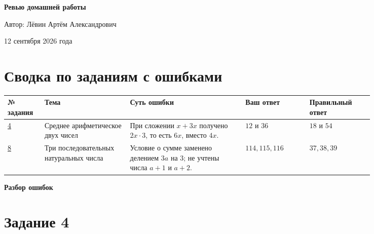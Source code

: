\documentclass[12pt,a4paper]{article}
\begin{document}
\hypersetup{pageanchor=false}

\begin{titlepage}
\thispagestyle{empty}
\begin{center}
\vspace*{0.22\textheight}
{\LARGE\bfseries Ревью домашней работы\par}
\vspace{1.4em}
{\large Автор: Лёвин Артём Александрович\par}
\vspace{0.8em}
{\large 12 сентября 2026 года\par}
\vfill
{}
\end{center}
\end{titlepage}
\hypersetup{pageanchor=true}

\newpage
\section*{Сводка по заданиям с ошибками}
\small
\begin{center}
\begin{tabular}{P{0.07\linewidth} P{0.20\linewidth} P{0.27\linewidth} P{0.15\linewidth} P{0.15\linewidth}}
\toprule
№ задания & Тема & Суть ошибки & Ваш ответ & Правильный ответ \\
\midrule
\hyperref[task:4]{4} & Среднее арифметическое двух чисел & При сложении $x+3x$ получено $2x\cdot3$, то есть $6x$, вместо $4x$. & $12$ и $36$ & $18$ и $54$ \\
\addlinespace
\hyperref[task:8]{8} & Три последовательных натуральных числа & Условие о сумме заменено делением $3a$ на $3$; не учтены числа $a+1$ и $a+2$. & $114,115,116$ & $37,38,39$ \\
\bottomrule
\end{tabular}
\end{center}
\normalsize

\newpage
\thispagestyle{empty}
\vspace*{\fill}
\begin{center}
{\Huge\bfseries Разбор ошибок}
\end{center}
\vspace*{\fill}
\newpage

\label{task:4}
\section*{Задание 4}
\end{document}
